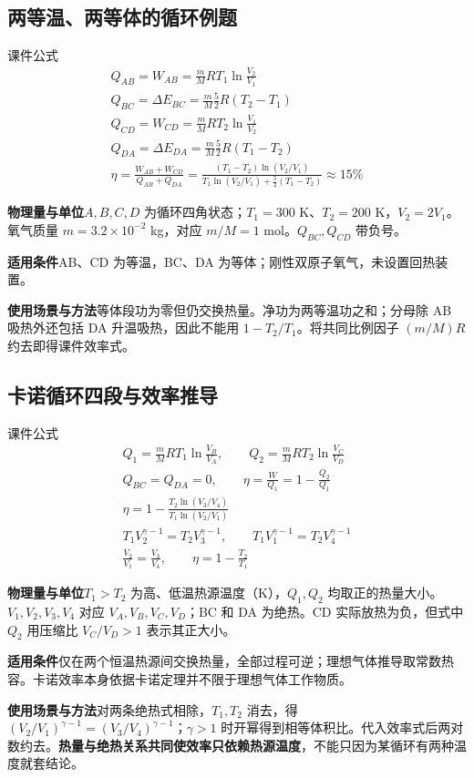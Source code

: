 \documentclass[UTF8,fontset=none,zihao=-4,a4paper]{ctexart}
\newcommand{\explain}[3]{\par\noindent\textbf{物理量与单位}\quad #1\par
\noindent\textbf{适用条件}\quad #2\par
\noindent\textbf{使用场景与方法}\quad #3\par}
\begin{document}
\par\noindent\begin{minipage}{\linewidth}
\subsection{两等温、两等体的循环例题}
\begin{infobox}[breakable=false]{课件公式}
\begin{gather*}Q_{AB}=W_{AB}=\frac mM RT_1\ln\frac{V_2}{V_1}\\Q_{BC}=\Delta E_{BC}=\frac mM\frac52R(T_2-T_1)\\Q_{CD}=W_{CD}=\frac mM RT_2\ln\frac{V_1}{V_2}\\Q_{DA}=\Delta E_{DA}=\frac mM\frac52R(T_1-T_2)\\\eta=\frac{W_{AB}+W_{CD}}{Q_{AB}+Q_{DA}}=\frac{(T_1-T_2)\ln(V_2/V_1)}{T_1\ln(V_2/V_1)+\frac52(T_1-T_2)}\approx15\%\end{gather*}
\end{infobox}
\end{minipage}\par
\explain{$A,B,C,D$ 为循环四角状态；$T_1=300$ K、$T_2=200$ K，$V_2=2V_1$。氧气质量 $m=3.2\times10^{-2}$ kg，对应 $m/M=1$ mol。$Q_{BC},Q_{CD}$ 带负号。}{AB、CD 为等温，BC、DA 为等体；刚性双原子氧气，未设置回热装置。}{等体段功为零但仍交换热量。净功为两等温功之和；分母除 AB 吸热外还包括 DA 升温吸热，因此不能用 $1-T_2/T_1$。将共同比例因子 $(m/M)R$ 约去即得课件效率式。}


\par\noindent\begin{minipage}{\linewidth}
\subsection{卡诺循环四段与效率推导}
\begin{infobox}[breakable=false]{课件公式}
\begin{gather*}Q_1=\frac mM RT_1\ln\frac{V_B}{V_A},\qquad Q_2=\frac mM RT_2\ln\frac{V_C}{V_D}\\Q_{BC}=Q_{DA}=0,\qquad\eta=\frac W{Q_1}=1-\frac{Q_2}{Q_1}\\\eta=1-\frac{T_2\ln(V_3/V_4)}{T_1\ln(V_2/V_1)}\\T_1V_2^{\gamma-1}=T_2V_3^{\gamma-1},\qquad T_1V_1^{\gamma-1}=T_2V_4^{\gamma-1}\\\frac{V_2}{V_1}=\frac{V_3}{V_4},\qquad\eta=1-\frac{T_2}{T_1}\end{gather*}
\end{infobox}
\end{minipage}\par
\explain{$T_1>T_2$ 为高、低温热源温度（K），$Q_1,Q_2$ 均取正的热量大小。$V_1,V_2,V_3,V_4$ 对应 $V_A,V_B,V_C,V_D$；BC 和 DA 为绝热。CD 实际放热为负，但式中 $Q_2$ 用压缩比 $V_C/V_D>1$ 表示其正大小。}{仅在两个恒温热源间交换热量，全部过程可逆；理想气体推导取常数热容。卡诺效率本身依据卡诺定理并不限于理想气体工作物质。}{对两条绝热式相除，$T_1,T_2$ 消去，得 $(V_2/V_1)^{\gamma-1}=(V_3/V_4)^{\gamma-1}$；$\gamma>1$ 时开幂得到相等体积比。代入效率式后两对数约去。\textbf{热量与绝热关系共同使效率只依赖热源温度}，不能只因为某循环有两种温度就套结论。}
\end{document}
